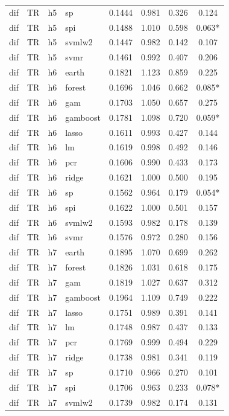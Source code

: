 \begin{ThreePartTable}
\begin{longtable}[t]{llclcccc}
dif & TR & h5 & sp & 0.1444 & 0.981 & 0.326 & 0.124\\
dif & TR & h5 & spi & 0.1488 & 1.010 & 0.598 & 0.063*\\
dif & TR & h5 & svmlw2 & 0.1447 & 0.982 & 0.142 & 0.107\\
dif & TR & h5 & svmr & 0.1461 & 0.992 & 0.407 & 0.206\\
\addlinespace
dif & TR & h6 & earth & 0.1821 & 1.123 & 0.859 & 0.225\\
dif & TR & h6 & forest & 0.1696 & 1.046 & 0.662 & 0.085*\\
dif & TR & h6 & gam & 0.1703 & 1.050 & 0.657 & 0.275\\
dif & TR & h6 & gamboost & 0.1781 & 1.098 & 0.720 & 0.059*\\
dif & TR & h6 & lasso & 0.1611 & 0.993 & 0.427 & 0.144\\
dif & TR & h6 & lm & 0.1619 & 0.998 & 0.492 & 0.146\\
dif & TR & h6 & pcr & 0.1606 & 0.990 & 0.433 & 0.173\\
dif & TR & h6 & ridge & 0.1621 & 1.000 & 0.500 & 0.195\\
dif & TR & h6 & sp & 0.1562 & 0.964 & 0.179 & 0.054*\\
dif & TR & h6 & spi & 0.1622 & 1.000 & 0.501 & 0.157\\
dif & TR & h6 & svmlw2 & 0.1593 & 0.982 & 0.178 & 0.139\\
dif & TR & h6 & svmr & 0.1576 & 0.972 & 0.280 & 0.156\\
\addlinespace
dif & TR & h7 & earth & 0.1895 & 1.070 & 0.699 & 0.262\\
dif & TR & h7 & forest & 0.1826 & 1.031 & 0.618 & 0.175\\
dif & TR & h7 & gam & 0.1819 & 1.027 & 0.637 & 0.312\\
dif & TR & h7 & gamboost & 0.1964 & 1.109 & 0.749 & 0.222\\
dif & TR & h7 & lasso & 0.1751 & 0.989 & 0.391 & 0.141\\
dif & TR & h7 & lm & 0.1748 & 0.987 & 0.437 & 0.133\\
dif & TR & h7 & pcr & 0.1769 & 0.999 & 0.494 & 0.229\\
dif & TR & h7 & ridge & 0.1738 & 0.981 & 0.341 & 0.119\\
dif & TR & h7 & sp & 0.1710 & 0.966 & 0.270 & 0.101\\
dif & TR & h7 & spi & 0.1706 & 0.963 & 0.233 & 0.078*\\
dif & TR & h7 & svmlw2 & 0.1739 & 0.982 & 0.174 & 0.131\\

\end{longtable}
\end{ThreePartTable}
